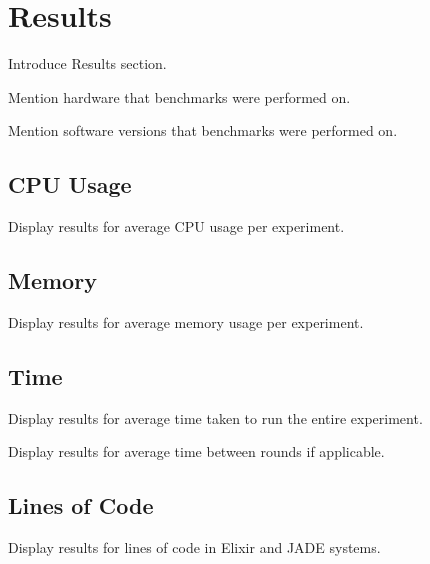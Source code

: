 \section{Results}

Introduce Results section.

Mention hardware that benchmarks were performed on.

Mention software versions that benchmarks were performed on.

\subsection{CPU Usage}

Display results for average CPU usage per experiment.

\subsection{Memory}

Display results for average memory usage per experiment.

\subsection{Time}

Display results for average time taken to run the entire experiment.

Display results for average time between rounds if applicable.

\subsection{Lines of Code}

Display results for lines of code in Elixir and JADE systems.
